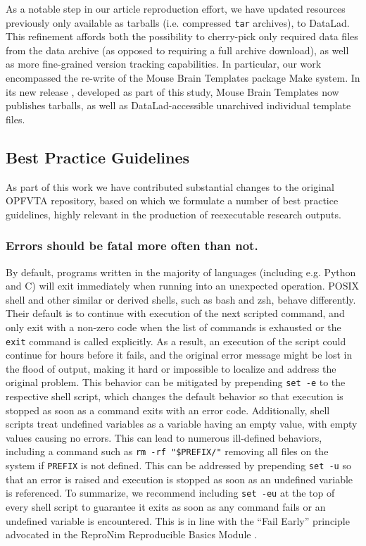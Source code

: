 As a notable step in our article reproduction effort, we have updated resources previously only available as tarballs (i.e. compressed \texttt{tar} archives), to DataLad.
This refinement affords both the possibility to cherry-pick only required data files from the data archive (as opposed to requiring a full archive download), as well as more fine-grained version tracking capabilities.
In particular, our work encompassed the re-write of the Mouse Brain Templates package \cite{mbt05} Make system.
In its new release \cite{mbt10}, developed as part of this study, Mouse Brain Templates now publishes tarballs, as well as DataLad-accessible unarchived individual template files.


\subsection{Best Practice Guidelines}

As part of this work we have contributed substantial changes to the original OPFVTA repository, based on which we formulate a number of best practice guidelines, highly relevant in the production of reexecutable research outputs.

\subsubsection{Errors should be fatal more often than not.}

By default, programs written in the majority of languages (including e.g. Python and C) will exit immediately when running into an unexpected operation.
POSIX shell and other similar or derived shells, such as bash and zsh, behave differently.
Their default is to continue with execution of the next scripted command, and only exit with a non-zero code when the list of commands is exhausted or the \texttt{exit} command is called explicitly.
As a result, an execution of the script could continue for hours before it fails, and the original error message might be lost in the flood of output, making it hard or impossible to localize and address the original problem.
This behavior can be mitigated by prepending \texttt{set -e} to the respective shell script, which changes the default behavior so that execution is stopped as soon as a command exits with an error code.
Additionally, shell scripts treat undefined variables as a variable having an empty value, with empty values causing no errors.
This can lead to numerous ill-defined behaviors, including a command such as \texttt{rm -rf "\${PREFIX}/"} removing all files on the system if \texttt{PREFIX} is not defined.
This can be addressed by prepending \texttt{set -u} so that an error is raised and execution is stopped as soon as an undefined variable is referenced.
To summarize, we recommend including \texttt{set -eu} at the top of every shell script to guarantee it exits as soon as any command fails or an undefined variable is encountered.
This is in line with the “Fail Early” principle advocated in the ReproNim Reproducible Basics Module \cite{repronim:reprobasics}.

